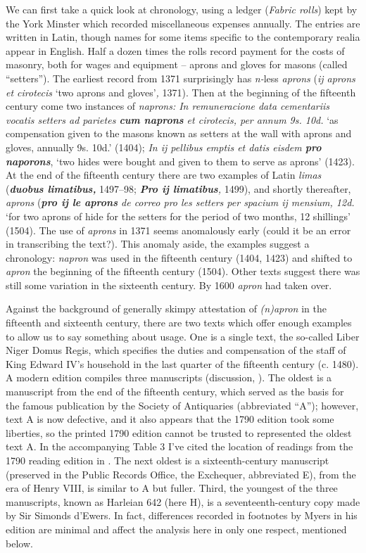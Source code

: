 \documentclass[output=paper,
modfonts
]{LSP/langsci}
\begin{document}
We can first take a quick look at chronology, using a ledger
(\emph{Fabric rolls}) kept by the York Minster which recorded
miscellaneous expenses annually. The entries are written in Latin,
though names for some items specific to the contemporary realia appear
in English. Half a dozen times the rolls record payment for the costs of
masonry, both for wages and equipment -- aprons and gloves for masons
(called ``setters''). The earliest record from 1371 surprisingly has
\emph{n-}less \emph{aprons} (\emph{ij aprons et cirotecis} `two aprons
and gloves'\emph{,} 1371). Then at the beginning of the fifteenth
century come two instances of \emph{naprons: In remuneracione data
cementariis vocatis setters ad parietes \textbf{cum naprons} et
cirotecis, per annum 9s. 10d.} `as compensation given to the masons
known as setters at the wall with aprons and gloves, annually 9s. 10d.'
(1404); \emph{In ij pellibus emptis et datis eisdem \textbf{pro
naporons}}, `two hides were bought and given to them to serve as aprons'
(1423). At the end of the fifteenth century there are two examples of
Latin \emph{limas} (\emph{\textbf{duobus limatibus,}} 1497--98;
\emph{\textbf{Pro ij limatibus},} 1499), and shortly thereafter,
\emph{aprons} (\emph{\textbf{pro ij le aprons} de correo pro les setters
per spacium ij mensium, 12d.} `for two aprons of hide for the setters
for the period of two months, 12 shillings' (1504). The use of
\emph{aprons} in 1371 seems anomalously early (could it be an error in
transcribing the text?). This anomaly aside, the examples suggest a
chronology: \emph{napron} was used in the fifteenth century (1404, 1423)
and shifted to \emph{apron} the beginning of the fifteenth century
(1504). Other texts suggest there was still some variation in the
sixteenth century. By 1600 \emph{apron} had taken over.

Against the background of generally skimpy attestation of
\emph{(n)apron} in the fifteenth and sixteenth century, there are two
texts which offer enough examples to allow us to say something about
usage. One is a single text, the so-called Liber Niger Domus Regis,
which specifies the duties and compensation of the staff of King Edward
IV's household in the last quarter of the fifteenth century (c. 1480). A
modern edition compiles three manuscripts (discussion, \citealt[51--60]{myers}). The oldest is a manuscript from the end of the fifteenth
century, which served as the basis for the famous \citeyear{XEDWARD} publication by
the Society of Antiquaries (abbreviated ``A''); however, text A is now
defective, and it also appears that the 1790 edition took some
liberties, so the printed 1790 edition cannot be trusted to represented
the oldest text A. In the accompanying Table 3 I've cited the location
of readings from the 1790 reading edition in \textbar{}\textbar{}. The
next oldest is a sixteenth-century manuscript (preserved in the Public
Records Office, the Exchequer, abbreviated E), from the era of Henry
VIII, is similar to A but fuller. Third, the youngest of the three
manuscripts, known as Harleian 642 (here H), is a seventeenth-century
copy made by Sir Simonds d'Ewers. In fact, differences recorded in
footnotes by Myers in his edition are minimal and affect the analysis
here in only one respect, mentioned below.
\end{document}
